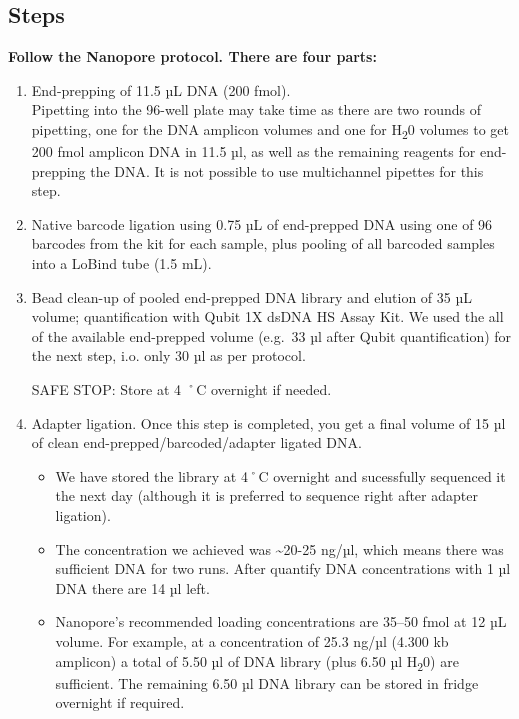 \documentclass[
]{book}
\begin{document}
\subsection{Steps}\label{steps-2}

\textbf{Follow the Nanopore protocol. There are four parts:}

\begin{enumerate}
\def\labelenumi{\arabic{enumi}.}
\item
  End-prepping of 11.5 µL DNA (200 fmol).\\
  Pipetting into the 96-well plate may take time as there are two rounds of pipetting, one for the DNA amplicon volumes and one for H\textsubscript{2}0 volumes to get 200 fmol amplicon DNA in 11.5 µl, as well as the remaining reagents for end-prepping the DNA. It is not possible to use multichannel pipettes for this step.
\item
  Native barcode ligation using 0.75 µL of end-prepped DNA using one of 96 barcodes from the kit for each sample, plus pooling of all barcoded samples into a LoBind tube (1.5 mL).
\item
  Bead clean-up of pooled end-prepped DNA library and elution of 35 µL volume; quantification with Qubit 1X dsDNA HS Assay Kit. We used the all of the available end-prepped volume (e.g.~33 µl after Qubit quantification) for the next step, i.o. only 30 µl as per protocol.

  SAFE STOP: Store at 4 ˚C overnight if needed.
\item
  Adapter ligation. Once this step is completed, you get a final volume of 15 µl of clean end-prepped/barcoded/adapter ligated DNA.

  \begin{itemize}
  \item
    We have stored the library at 4˚C overnight and sucessfully sequenced it the next day (although it is preferred to sequence right after adapter ligation).
  \item
    The concentration we achieved was \textasciitilde20-25 ng/µl, which means there was sufficient DNA for two runs. After quantify DNA concentrations with 1 µl DNA there are 14 µl left.
  \item
    Nanopore's recommended loading concentrations are 35--50 fmol at 12 µL volume. For example, at a concentration of 25.3 ng/µl (4.300 kb amplicon) a total of 5.50 µl of DNA library (plus 6.50 µl H\textsubscript{2}0) are sufficient. The remaining 6.50 µl DNA library can be stored in fridge overnight if required.
  \end{itemize}
\end{enumerate}
\end{document}
